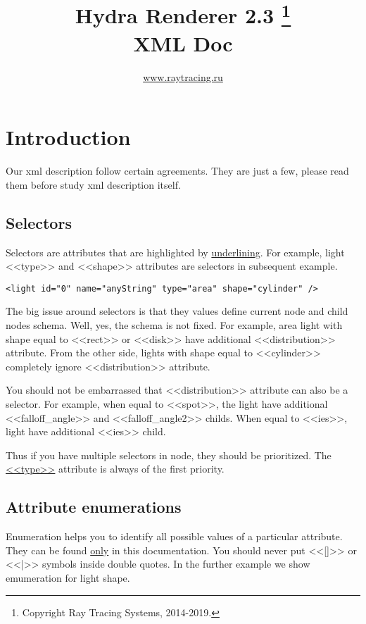 \documentclass[a4paper,11pt]{report}
\title{\Huge \textbf{Hydra Renderer 2.3}  \footnote{ Copyright \space \textcopyright \space  Ray Tracing Systems, 2014-2019.} \\ \huge XML Doc }
\author{\url{www.raytracing.ru}}
\begin{document}
\maketitle

\chapter{Introduction}

Our xml description follow certain agreements. They are just a few, please read them before study xml description itself.

\section{Selectors}

Selectors are attributes that are highlighted by \underline{underlining}. For example, light <<type>> and <<shape>> attributes are selectors in subsequent example.

\lstset{language=XML}
\begin{lstlisting}
<light id="0" name="anyString" type="area" shape="cylinder" />
\end{lstlisting}

The big issue around selectors is that they values define current node and child nodes schema. Well, yes, the schema is not fixed. For example, area light with shape equal to <<rect>> or <<disk>> have additional <<distribution>> attribute. From the other side, lights with shape equal to <<cylinder>> completely ignore <<distribution>> attribute.

You should not be embarrassed that <<distribution>> attribute can also be a selector. For example, when equal to <<spot>>, the light have additional <<falloff\_angle>> and <<falloff\_angle2>> childs. When equal to <<ies>>, light have additional <<ies>> child.

Thus if you have multiple selectors in node, they should be prioritized. The \underline{<<type>>} attribute is always of the first priority. 

\section{Attribute enumerations}

Enumeration helps you to identify all possible values of a particular attribute. They can be found \underline{only} in this documentation. You should never put <<[]>> or <<|>> symbols inside double quotes. In the further example we show emumeration for light shape. 
\end{document}
